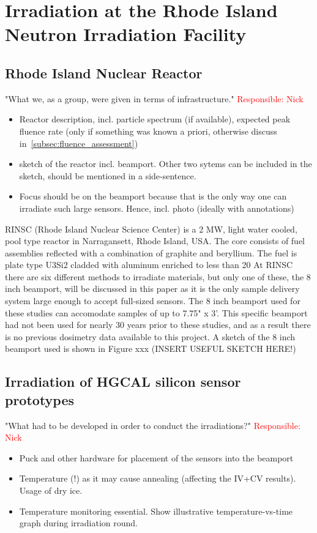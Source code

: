 \section{Irradiation at the Rhode Island Neutron Irradiation Facility}
\label{sec:irradiation}

\subsection{Rhode Island Nuclear Reactor}
\label{subsec:RINSC}
"What we, as a group, were given in terms of infrastructure." \textcolor{red}{Responsible: Nick}
\begin{itemize}
  \item Reactor description, incl. particle spectrum (if available), expected peak fluence rate (only if something was known a priori, otherwise discuss in~\ref{subsec:fluence_assessment})
  \item sketch of the reactor incl. beamport. Other two sytems can be included in the sketch, should be mentioned in a side-sentence.
  \item Focus should be on the beamport because that is the only way one can irradiate such large sensors. Hence, incl. photo (ideally with annotations)
\end{itemize}

RINSC (Rhode Island Nuclear Science Center) is a 2 MW, light water cooled, pool type reactor in Narragansett, Rhode Island, USA.
The core consists of fuel assemblies reflected with a combination of graphite and beryllium.
The fuel is plate type U3Si2 cladded with aluminum enriched to less than 20%
At RINSC there are six different methods to irradiate materials, but only one of these, the 8 inch beamport, will be discussed in this paper as it is the only sample delivery system large enough to accept full-sized sensors.
The 8 inch beamport used for these studies can accomodate samples of up to 7.75" x 3'.
This specific beamport had not been used for nearly 30 years prior to these studies, and as a result there is no previous dosimetry data available to this project.
A sketch of the 8 inch beamport used is shown in Figure xxx (INSERT USEFUL SKETCH HERE!)

\subsection{Irradiation of HGCAL silicon sensor prototypes}
\label{subsec:irradiation}
"What had to be developed in order to conduct the irradiations?" \textcolor{red}{Responsible: Nick}
\begin{itemize}
  \item Puck and other hardware for placement of the sensors into the beamport
  \item Temperature (!) as it may cause annealing (affecting the IV+CV results). Usage of dry ice.
  \item Temperature monitoring essential. Show illustrative temperature-vs-time graph during irradiation round. 
\end{itemize}

